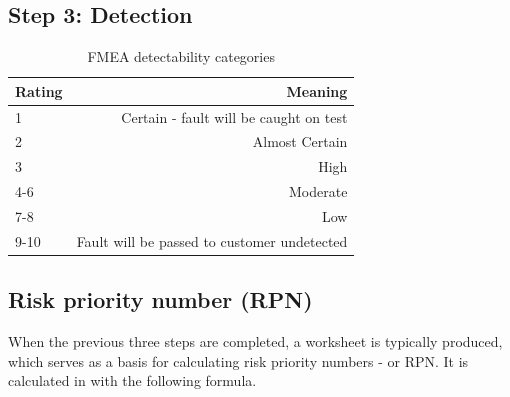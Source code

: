 \subsection*{Step 3: Detection}

\begin{table}[h]
\centering
    \begin{tabular}{ | l | r | }
    \hline
    Rating & Meaning \\ \hline \hline
    1      & Certain - fault will be caught on test  \\ \hline
    2      & Almost Certain \\ \hline
    3      & High \\ \hline
    4-6    & Moderate \\ \hline
    7-8    & Low \\ \hline
    9-10   & Fault will be passed to customer undetected \\ \hline
    \end{tabular}
\caption{FMEA detectability categories}
\label{table:fmea_detectability}
\end{table}




\subsection*{Risk priority number (RPN)}
When the previous three steps are completed, a worksheet is typically produced, which serves as a basis for calculating risk priority numbers - or RPN. It is calculated in with the following formula.

